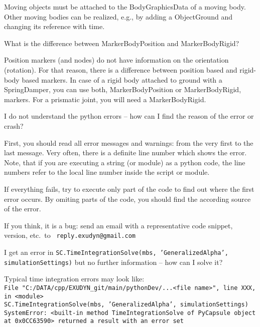 	Moving objects must be attached to the BodyGraphicsData of a moving body. Other moving bodies can be realized, e.g., by adding a ObjectGround and changing its reference with time.
	\ei
  \item What is the difference between MarkerBodyPosition and MarkerBodyRigid?
	\bi
	\item[$\ra$] Position markers (and nodes) do not have information on the orientation (rotation). For that reason, there is a difference between position based and rigid-body based markers. In case of a rigid body attached to ground with a SpringDamper, you can use both, MarkerBodyPosition or MarkerBodyRigid, markers. For a prismatic joint, you will need a MarkerBodyRigid.
	\ei
  \item I do not understand the python errors -- how can I find the reason of the error or crash?
	\bi
	\item[$\ra$] First, you should read all error messages and warnings: from the very first to the last message. Very often, there is a definite line number which shows the error. Note, that if you are executing a string (or module) as a python code, the line numbers refer to the local line number inside the script or module.
	\item[$\ra$] If everything fails, try to execute only part of the code to find out where the first error occurs. By omiting parts of the code, you should find the according source of the error.
	\item[$\ra$] If you think, it is a bug: send an email with a representative code snippet, version, etc.\ to \texttt{ reply.exudyn@gmail.com}
	\ei
  \item I get an error in \texttt{SC.TimeIntegrationSolve(mbs, 'GeneralizedAlpha', simulationSettings)} but no further information -- how can I solve it?
	\bi
	\item[$\ra$] Typical time integration errors may look like:\\
	{\footnotesize
  \texttt{File "C:/DATA/cpp/EXUDYN\_git/main/pythonDev/...<file name>", line XXX, in <module>}\\  
	\texttt{SC.TimeIntegrationSolve(mbs, 'GeneralizedAlpha', simulationSettings)}\\
  \texttt{SystemError: <built-in method TimeIntegrationSolve of PyCapsule object at 0x0CC63590> returned a result with an error set}}
